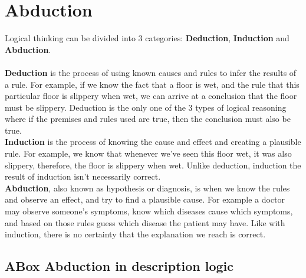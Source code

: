 \chapter{Abduction}\label{chap:Abduction}

Logical thinking can be divided into 3 categories: \textbf{Deduction}, \textbf{Induction} and \textbf{Abduction}. \\ \\
\textbf{Deduction} is the process of using known causes and rules to infer the results of a rule. For example, if we know the fact that a floor is wet, and the rule that this particular floor is slippery when wet, we can arrive at a conclusion that the floor must be slippery. Deduction is the only one of the 3 types of logical reasoning where if the premises and rules used are true, then the conclusion must also be true. \\ 
\textbf{Induction} is the process of knowing the cause and effect and creating a plausible rule. For example, we know that whenever we've seen this floor wet, it was also slippery, therefore, the floor is slippery when wet. Unlike deduction, induction the result of induction isn't necessarily correct. \\
\textbf{Abduction}, also known as hypothesis or diagnosis, is when we know the rules and observe an effect, and try to find a plausible cause. For example a doctor may observe someone's symptoms, know which diseases cause which symptoms, and based on those rules guess which disease the patient may have. Like with induction, there is no certainty that the explanation we reach is correct.

\section{ABox Abduction in description logic}

